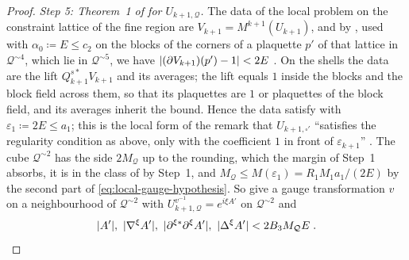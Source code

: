 \documentclass[11pt]{preprint}
\DeclarePairedDelimiter{\abs}{\lvert}{\rvert}
\numberwithin{equation}{section}
\theoremstyle{definition}
\theoremstyle{remark}
\theoremstyle{plain}
\begin{document}
\begin{proof}
\emph{Step 5: Theorem~1 of \cite{BalabanVAR} for $U_{k+1,\mathcal Q}$.} The data of the local problem on the constraint lattice of the fine region are $V_{k+1} = M^{k+1}(U_{k+1})$, and by \cite[Proposition~2]{BalabanAVG}, used with $\alpha_0 \coloneqq E \leq c_2$ on the blocks of the corners of a plaquette $p'$ of that lattice in $\mathcal Q^{\sim4}$, which lie in $\mathcal Q^{\sim5}$, we have $\abs{(\partial V_{k+1})(p') - 1} < 2E$ \cite[(54), p.~26]{BalabanAVG}. On the shells the data are the lift $Q^{s*}_{k+1}V_{k+1}$ and its averages; the lift \cite[(1.3), p.~246]{BalabanCRE} equals $1$ inside the blocks and the block field across them, so that its plaquettes are $1$ or plaquettes of the block field, and its averages inherit the bound. Hence the data satisfy \cite[(7), p.~278]{BalabanVAR} with $\varepsilon_1 \coloneqq 2E \leq a_1$; this is the local form of the remark that $U_{k+1,\square'}$ ``satisfies the regularity condition as above, only with the coefficient $1$ in front of $\varepsilon_{k+1}$'' \cite[p.~267]{BalabanCRE}. The cube $\mathcal Q^{\sim2}$ has the side $2M_{\mathcal Q}$ up to the rounding, which the margin of Step~1 absorbs, it is in the class of \cite[p.~279]{BalabanVAR} by Step~1, and $M_{\mathcal Q} \leq M(\varepsilon_1) = R_1M_1a_1/(2E)$ by the second part of \eqref{eq:local-gauge-hypothesis}. So \cite[(9), (10), p.~279]{BalabanVAR} give a gauge transformation $v$ on a neighbourhood of $\mathcal Q^{\sim2}$ with $U_{k+1,\mathcal Q}^{v^{-1}} = e^{i\xi A'}$ on $\mathcal Q^{\sim2}$ and
\begin{equation}\label{eq:local-minimiser}
    \abs{A'},\ \abs{\nabla^\xi A'},\ \abs{\partial^{\xi*}\partial^\xi A'},\ \abs{\Delta^\xi A'} < 2B_3M_{\mathcal Q}E\;.
\end{equation}


\end{proof}
\end{document}
